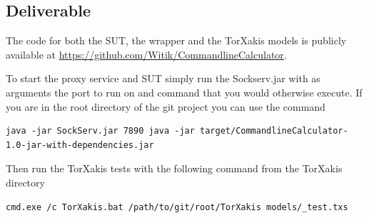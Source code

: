 \documentclass[11pt,a4paper]{article}
\begin{document}
\subsection{Deliverable}

The code for both the SUT, the wrapper and the TorXakis models is
publicly available at
\url{https://github.com/Witik/CommandlineCalculator}.

To start the proxy service and SUT simply run the Sockserv.jar with as
arguments the port to run on and command that you would otherwise
execute. If you are in the root directory of the git project you can use the command

\begin{verbatim}
java -jar SockServ.jar 7890 java -jar target/CommandlineCalculator-1.0-jar-with-dependencies.jar
\end{verbatim}

Then run the TorXakis tests with the following command from the TorXakis directory

\begin{verbatim}
cmd.exe /c TorXakis.bat /path/to/git/root/TorXakis models/_test.txs
\end{verbatim}
\end{document}
